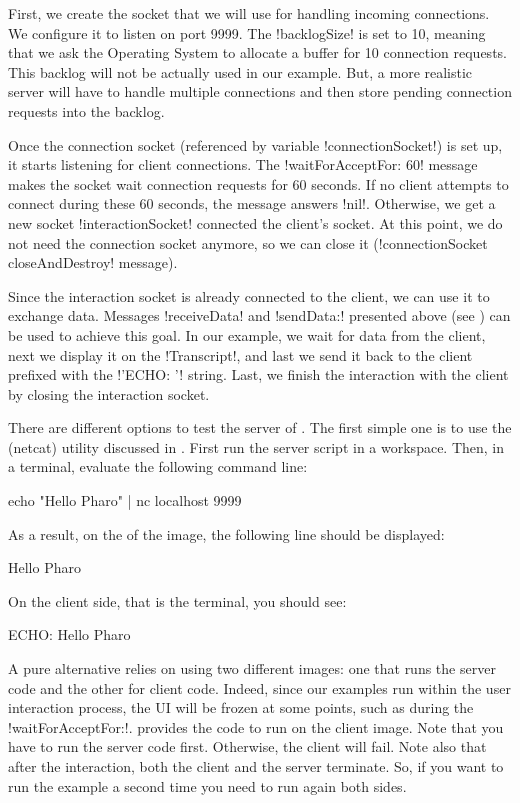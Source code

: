 \documentclass[a4paper,10pt,twoside]{book}
\begin{document}
First, we create the socket that we will use for handling incoming connections.
We configure it to listen on port 9999.
The \ct!backlogSize! is set to 10, meaning that we ask the Operating System to allocate a buffer for 10 connection requests. 
This backlog will not be actually used in our example.
But, a more realistic server will have to handle multiple connections and then store pending connection requests into the backlog.

Once the connection socket (referenced by variable \ct!connectionSocket!) is set up, it starts listening for client connections.
The \ct!waitForAcceptFor: 60! message makes the socket wait connection requests for 60 seconds.
If no client attempts to connect during these 60 seconds, the message answers \ct!nil!.
Otherwise, we get a new socket \ct!interactionSocket! connected the client's socket.
At this point, we do not need the connection socket anymore, so we can close it (\ct!connectionSocket closeAndDestroy! message).

Since the interaction socket is already connected to the client, we can use it to exchange data.
Messages \ct!receiveData! and \ct!sendData:! presented above (see ) can be used to achieve this goal.
In our example, we wait for data from the client, next we display it on the \ct!Transcript!, and last we send it back to the client prefixed with the \ct!'ECHO: '! string.
Last, we finish the interaction with the client by closing the interaction socket.

There are different options to test the server of .
The first simple one is to use the  (netcat) utility discussed in .
First run the server script in a workspace.
Then, in a terminal, evaluate the following command line: 
\begin{code}[]
	echo "Hello Pharo" | nc localhost 9999
\end{code}

As a result, on the  of the \pharo image, the following line should be displayed:
\begin{code}[]
	Hello Pharo
\end{code}

On the client side, that is the terminal, you should see:
\begin{code}[]
	ECHO: Hello Pharo
\end{code}

A pure \pharo alternative relies on using two different images: one that runs the server code and the other for client code. 
Indeed, since our examples run within the user interaction process, the \pharo UI will be frozen at some points, such as during the \ct!waitForAcceptFor:!.
 provides the code to run on the client image.
Note that you have to run the server code first.
Otherwise, the client will fail.
Note also that after the interaction, both the client and the server terminate.
So, if you want to run the example a second time you need to run again both sides.
\end{document}
